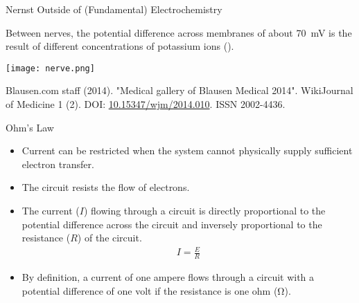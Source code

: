 \documentclass[notes=show]{beamer}
\begin{document}
\begin{frame}{Nernst Outside of (Fundamental) Electrochemistry}
	\begin{minipage}{0.6\textwidth}
		\raggedright{}
		Between nerves, the potential difference across membranes of about
		\SI{70}{\milli\volt} is the result of different concentrations of
		potassium ions ().
	\end{minipage}
	\hfill
	\begin{minipage}{0.3\textwidth}
		\texttt{[image: nerve.png]}
	\end{minipage}

	\bigskip
	
	\begin{footnotesize}
		Blausen.com staff (2014). "Medical gallery of Blausen
		Medical 2014". WikiJournal of Medicine 1 (2).
		DOI: \href{dx.doi.org/10.15347/wjm/2014.010}{10.15347/wjm/2014.010}. ISSN 2002-4436.
	\end{footnotesize}
\end{frame}




\clearpage
			
\begin{frame}{Ohm's Law}
	\begin{itemize}
		\item Current can be restricted when the system cannot
			physically supply sufficient electron transfer.
		\item The circuit \alert{resists} the flow of electrons.
		\item The current ($I$) flowing through a circuit is directly
			proportional to the \alert{potential difference} across
			the circuit and inversely proportional to the resistance
			($R$) of the circuit.
			\begin{align*}
				I = \frac{E}{R}
			\end{align*}
		\item By definition, a current of one ampere flows through a
			circuit with a potential difference of one volt if the
			resistance is one ohm (\si{\ohm}).
	\end{itemize}
\end{frame}
\end{document}

